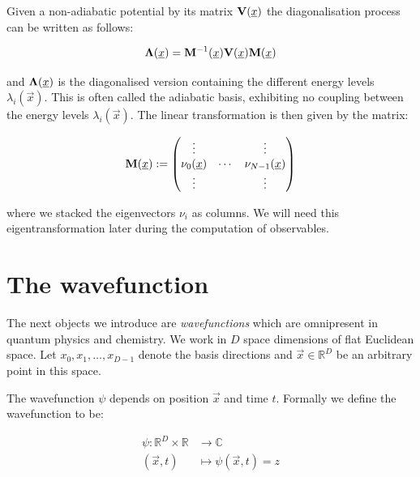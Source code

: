 Given a non-adiabatic potential by its matrix $\mathbf{V}(\underline{x})$ the diagonalisation
process can be written as follows:

\begin{equation} \label{eq:eigentransformation}
  \mathbf{\Lambda}(\underline{x}) = \mathbf{M}{}^{-1}(\underline{x}) \mathbf{V}(\underline{x}) \mathbf{M}(\underline{x})
\end{equation}

and $\mathbf{\Lambda}(\underline{x})$ is the diagonalised version containing the different
energy levels $\lambda_i(\vec{x})$. This is often called the adiabatic basis,
exhibiting no coupling between the energy levels $\lambda_i(\vec{x})$.
The linear transformation is then given by the matrix:

\begin{equation} \label{eq:eigentransformation_matrix}
  \mathbf{M}(\underline{x}) :=
  \begin{pmatrix}
    \vdots         &        & \vdots \\
    \nu_0(\underline{x}) & \cdots & \nu_{N-1}(\underline{x}) \\
    \vdots         &        & \vdots
  \end{pmatrix}
\end{equation}

where we stacked the eigenvectors $\nu_{i}$ as columns. We will need this
eigentransformation later during the computation of observables.


\section{The wavefunction}


The next objects we introduce are \emph{wavefunctions} which are omnipresent in
quantum physics and chemistry. We work in $D$ space dimensions of flat Euclidean space.
Let $x_0, x_1, \ldots, x_{D-1}$ denote the basis directions and $\vec{x} \in \mathbb{R}^D$
be an arbitrary point in this space.

The wavefunction $\psi$ depends on position $\vec{x}$ and time $t$. Formally
we define the wavefunction to be:

\begin{equation} \label{eq:wavefunction}
\begin{split}
  \psi : \mathbb{R}^D \times \mathbb{R} & \rightarrow \mathbb{C} \\
         \left(\vec{x}, t\right)        & \mapsto     \psi\left(\vec{x}, t\right) = z
\end{split}
\end{equation}

